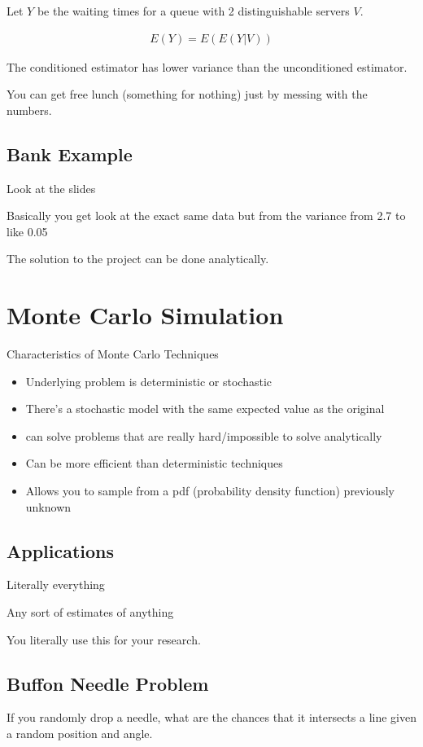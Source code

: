 \documentclass[fleqn]{report}
\newcommand{\equations} [1] {
\begin{gather*}
#1
\end{gather*}
}
\begin{document}
Let $Y$ be the waiting times for a queue with 2 distinguishable servers $V$. 

\equations{
    E(Y)
    =
    E(E(Y | V))
}

The conditioned estimator has lower variance 
than the unconditioned estimator. 

You can get free lunch (something for nothing) just by messing with 
the numbers. 

\subsection{Bank Example}
Look at the slides 

Basically you get look at the exact same data but from the variance 
from 2.7 to like 0.05

The solution to the project can be done analytically. 

\section{Monte Carlo Simulation}
Characteristics of Monte Carlo Techniques 
\begin{itemize}
    \item 
    Underlying problem is deterministic or stochastic 
    \item 
    There's a stochastic model with the same expected value as the original 
    \item 
    can solve problems that are really hard/impossible to solve analytically 
    \item 
    Can be more efficient than deterministic techniques 
    \item 
    Allows you to sample from a pdf (probability density function) previously 
    unknown 
\end{itemize}

\subsection{Applications}
Literally everything 

Any sort of estimates of anything 

You literally use this for your research. 

\subsection{Buffon Needle Problem}
If you randomly drop a needle, what are the chances that it intersects a line 
given a random position and angle. 
\end{document}
